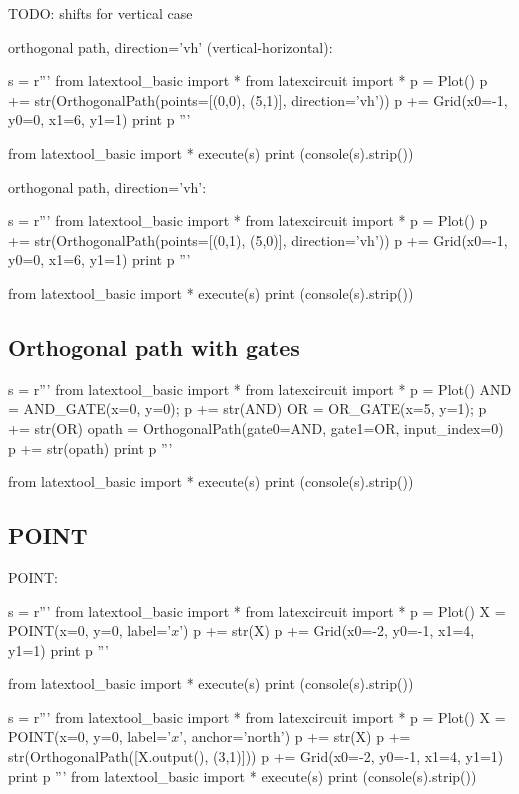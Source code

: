 TODO: shifts for vertical case


\newpage
orthogonal path, direction='vh' (vertical-horizontal):
\begin{python}
s = r'''
from latextool_basic import *
from latexcircuit import *
p = Plot()
p += str(OrthogonalPath(points=[(0,0), (5,1)], direction='vh'))
p += Grid(x0=-1, y0=0, x1=6, y1=1)
print p
'''

from latextool_basic import *
execute(s)
print (console(s).strip())
\end{python}



orthogonal path, direction='vh':
\begin{python}
s = r'''
from latextool_basic import *
from latexcircuit import *
p = Plot()
p += str(OrthogonalPath(points=[(0,1), (5,0)], direction='vh'))
p += Grid(x0=-1, y0=0, x1=6, y1=1)
print p
'''

from latextool_basic import *
execute(s)
print (console(s).strip())
\end{python}


\newpage
\subsection{Orthogonal path with gates}
\begin{python}
s = r'''
from latextool_basic import *
from latexcircuit import *
p = Plot()
AND = AND_GATE(x=0, y=0); p += str(AND)
OR = OR_GATE(x=5, y=1); p += str(OR)
opath = OrthogonalPath(gate0=AND, gate1=OR, input_index=0)
p += str(opath)
print p
'''

from latextool_basic import *
execute(s)
print (console(s).strip())
\end{python}




\newpage
\subsection{POINT}
POINT:
\begin{python}
s = r'''
from latextool_basic import *
from latexcircuit import *
p = Plot()
X = POINT(x=0, y=0, label='$x$')
p += str(X)
p += Grid(x0=-2, y0=-1, x1=4, y1=1)
print p
'''

from latextool_basic import *
execute(s)
print (console(s).strip())
\end{python}



\begin{python}
s = r'''
from latextool_basic import *
from latexcircuit import *
p = Plot()
X = POINT(x=0, y=0, label='$x$', anchor='north')
p += str(X)
p += str(OrthogonalPath([X.output(), (3,1)]))
p += Grid(x0=-2, y0=-1, x1=4, y1=1)
print p
'''
from latextool_basic import *
execute(s)
print (console(s).strip())
\end{python}





